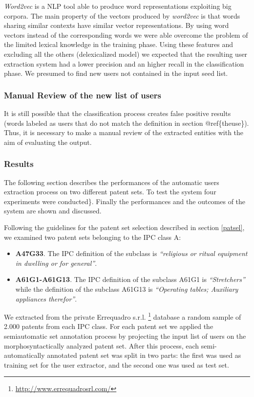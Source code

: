 \documentclass[]{book}
\providecommand{\tightlist}{%
  \setlength{\itemsep}{0pt}\setlength{\parskip}{0pt}}
\let\rmarkdownfootnote\footnote%
\def\footnote{\protect\rmarkdownfootnote}
\begin{document}
\emph{Word2vec} is a NLP tool able to produce word representations
exploiting big corpora. The main property of the vectors produced by
\emph{word2vec} is that words sharing similar contexts have similar
vector representations. By using word vectors instead of the
corresponding words we were able overcome the problem of the limited
lexical knowledge in the training phase. Using these features and
excluding all the others (delexicalized model) we expected that the
resulting user extraction system had a lower precision and an higher
recall in the classification phase. We presumed to find new users not
contained in the input seed list.

\subsubsection{Manual Review of the new list of users}\label{manrev}

It is still possible that the classification process creates false
positive results (words labeled as users that do not match the
definition in section @ref\{theuse\}). Thus, it is necessary to make a
manual review of the extracted entities with the aim of evaluating the
output.

\subsubsection{Results}\label{results}

The following section describes the performances of the automatic users
extraction process on two different patent sets. To test the system four
experiments were conducted\}. Finally the performances and the outcomes
of the system are shown and discussed.

Following the guidelines for the patent set selection described in
section \ref{patsel}, we examined two patent sets belonging to the IPC
class A:

\begin{itemize}
\tightlist
\item
  \textbf{A47G33}. The IPC definition of the subclass is
  \emph{``religious or ritual equipment in dwelling or for general''}.
\item
  \textbf{A61G1-A61G13}. The IPC definition of the subclass A61G1 is
  \emph{``Stretchers''} while the definition of the subclass A61G13 is
  \emph{``Operating tables; Auxiliary appliances therefor''}.
\end{itemize}

We extracted from the private Errequadro s.r.l. \footnote{\url{http://www.errequadrosrl.com/}}
database a random sample of 2.000 patents from each IPC class. For each
patent set we applied the semiautomatic set annotation process by
projecting the input list of users on the morphosyntactically analyzed
patent set. After this process, each semi-automatically annotated patent
set was split in two parts: the first was used as training set for the
user extractor, and the second one was used as test set.
\end{document}
